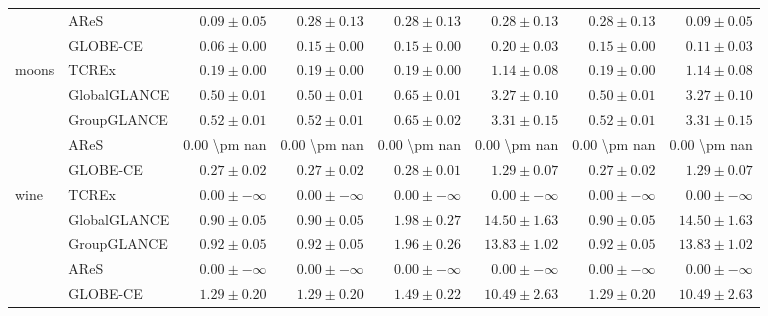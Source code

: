 \begin{table}[ht]
\begin{center}
\begin{sc}
\begin{scriptsize}
\begin{tabular}{l|l|rrrrrr}
 & AReS & $0.09\pm{0.05}$ & $0.28\pm{0.13}$ & $0.28\pm{0.13}$ & $0.28\pm{0.13}$ & $0.28\pm{0.13}$ & $0.09\pm{0.05}$ \\
 & GLOBE-CE & $0.06\pm{0.00}$ & $0.15\pm{0.00}$ & $0.15\pm{0.00}$ & $0.20\pm{0.03}$ & $0.15\pm{0.00}$ & $0.11\pm{0.03}$ \\
\midrule
\multirow{5}{*}{moons} & TCREx & $\boldsymbol{0.19\pm{0.00}}$ & $\boldsymbol{0.19\pm{0.00}}$ & $\boldsymbol{0.19\pm{0.00}}$ & $\boldsymbol{1.14\pm{0.08}}$ & $\boldsymbol{0.19\pm{0.00}}$ & $\boldsymbol{1.14\pm{0.08}}$ \\
 & GlobalGLANCE & $0.50\pm{0.01}$ & $0.50\pm{0.01}$ & $0.65\pm{0.01}$ & $3.27\pm{0.10}$ & $0.50\pm{0.01}$ & $3.27\pm{0.10}$ \\
 & GroupGLANCE & $0.52\pm{0.01}$ & $0.52\pm{0.01}$ & $0.65\pm{0.02}$ & $3.31\pm{0.15}$ & $0.52\pm{0.01}$ & $3.31\pm{0.15}$ \\
 & AReS & 0.00 \textbackslash{}pm nan & 0.00 \textbackslash{}pm nan & 0.00 \textbackslash{}pm nan & 0.00 \textbackslash{}pm nan & 0.00 \textbackslash{}pm nan & 0.00 \textbackslash{}pm nan \\
 & GLOBE-CE & $0.27\pm{0.02}$ & $0.27\pm{0.02}$ & $0.28\pm{0.01}$ & $1.29\pm{0.07}$ & $0.27\pm{0.02}$ & $1.29\pm{0.07}$ \\
\midrule
\multirow{5}{*}{wine} & TCREx & $\boldsymbol{0.00\pm{-\infty}}$ & $\boldsymbol{0.00\pm{-\infty}}$ & $\boldsymbol{0.00\pm{-\infty}}$ & $\boldsymbol{0.00\pm{-\infty}}$ & $\boldsymbol{0.00\pm{-\infty}}$ & $\boldsymbol{0.00\pm{-\infty}}$ \\
 & GlobalGLANCE & $0.90\pm{0.05}$ & $0.90\pm{0.05}$ & $1.98\pm{0.27}$ & $14.50\pm{1.63}$ & $0.90\pm{0.05}$ & $14.50\pm{1.63}$ \\
 & GroupGLANCE & $0.92\pm{0.05}$ & $0.92\pm{0.05}$ & $1.96\pm{0.26}$ & $13.83\pm{1.02}$ & $0.92\pm{0.05}$ & $13.83\pm{1.02}$ \\
 & AReS & $\boldsymbol{0.00\pm{-\infty}}$ & $\boldsymbol{0.00\pm{-\infty}}$ & $\boldsymbol{0.00\pm{-\infty}}$ & $\boldsymbol{0.00\pm{-\infty}}$ & $\boldsymbol{0.00\pm{-\infty}}$ & $\boldsymbol{0.00\pm{-\infty}}$ \\
 & GLOBE-CE & $1.29\pm{0.20}$ & $1.29\pm{0.20}$ & $1.49\pm{0.22}$ & $10.49\pm{2.63}$ & $1.29\pm{0.20}$ & $10.49\pm{2.63}$ \\
\bottomrule
\end{tabular}
\end{scriptsize}
\end{sc}
\end{center}
\end{table}

